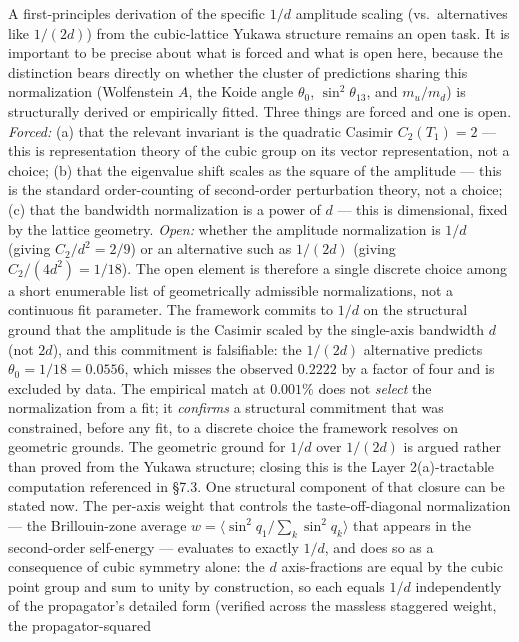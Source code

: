 \documentclass[
]{article}
\begin{document}
A first-principles derivation of the specific \(1/d\) amplitude scaling
(vs.~alternatives like \(1/(2d)\)) from the cubic-lattice Yukawa
structure remains an open task. It is important to be precise about what
is forced and what is open here, because the distinction bears directly
on whether the cluster of predictions sharing this normalization
(Wolfenstein \(A\), the Koide angle \(\theta_0\), \(\sin^2\theta_{13}\),
and \(m_u/m_d\)) is structurally derived or empirically fitted. Three
things are forced and one is open. \emph{Forced:} (a) that the relevant
invariant is the quadratic Casimir \(C_2(T_1) = 2\) --- this is
representation theory of the cubic group on its vector representation,
not a choice; (b) that the eigenvalue shift scales as the square of the
amplitude --- this is the standard order-counting of second-order
perturbation theory, not a choice; (c) that the bandwidth normalization
is a power of \(d\) --- this is dimensional, fixed by the lattice
geometry. \emph{Open:} whether the amplitude normalization is \(1/d\)
(giving \(C_2/d^2 = 2/9\)) or an alternative such as \(1/(2d)\) (giving
\(C_2/(4d^2) = 1/18\)). The open element is therefore a single discrete
choice among a short enumerable list of geometrically admissible
normalizations, not a continuous fit parameter. The framework commits to
\(1/d\) on the structural ground that the amplitude is the Casimir
scaled by the single-axis bandwidth \(d\) (not \(2d\)), and this
commitment is falsifiable: the \(1/(2d)\) alternative predicts
\(\theta_0 = 1/18 = 0.0556\), which misses the observed \(0.2222\) by a
factor of four and is excluded by data. The empirical match at
\(0.001\%\) does not \emph{select} the normalization from a fit; it
\emph{confirms} a structural commitment that was constrained, before any
fit, to a discrete choice the framework resolves on geometric grounds.
The geometric ground for \(1/d\) over \(1/(2d)\) is argued rather than
proved from the Yukawa structure; closing this is the Layer
2(a)-tractable computation referenced in §7.3. One structural component
of that closure can be stated now. The per-axis weight that controls the
taste-off-diagonal normalization --- the Brillouin-zone average
\(w = \langle \sin^2 q_1 / \sum_k \sin^2 q_k \rangle\) that appears in
the second-order self-energy --- evaluates to exactly \(1/d\), and does
so as a consequence of cubic symmetry alone: the \(d\) axis-fractions
are equal by the cubic point group and sum to unity by construction, so
each equals \(1/d\) independently of the propagator's detailed form
(verified across the massless staggered weight, the propagator-squared
\end{document}
